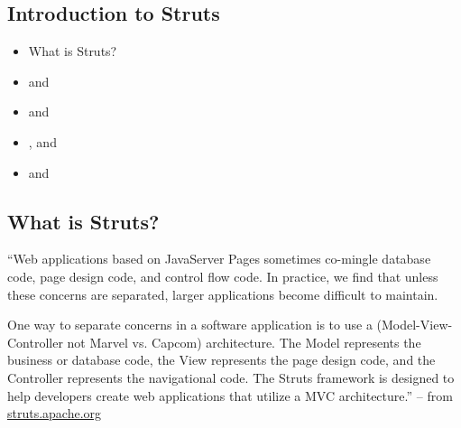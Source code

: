 \begin{ifhtml}
  \begin{s5slide}
    \section{Introduction to Struts}
    \begin{itemize}
      \item What is Struts?
      \item {} and 
      \item {} and 
      \item {},  and 
      \item {} and 
    \end{itemize}
  \end{s5slide}

  \begin{s5slide}
    \section{What is Struts?}
     ``Web applications based on JavaServer Pages sometimes co-mingle database code, page design code, and control flow code. In practice, we find that unless these concerns are separated, larger applications become difficult to maintain.

One way to separate concerns in a software application is to use a \MVC (Model-View-Controller not Marvel vs. Capcom) 
architecture. The Model represents the business or database code, the View represents the page design code, and the Controller represents the navigational code. The Struts framework is designed to help developers create web applications that utilize a MVC architecture.'' -- from 
\href{http://struts.apache.org}{struts.apache.org}

    \begin{slideshow}
      \item {}
      \item {}
    \end{slideshow}


\end{s5slide}
\end{ifhtml}
